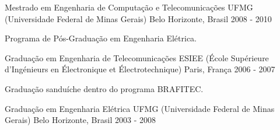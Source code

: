 

\begin{cventries}

  \cventry
    {Mestrado em Engenharia de Computação e Telecomunicações} %
    {UFMG (Universidade Federal de Minas Gerais)} %
    {Belo Horizonte, Brasil} %
    {2008 - 2010} %
    {
      \begin{cvitems} %
        \item {Programa de Pós-Graduação em Engenharia Elétrica.}
      \end{cvitems}
    }

  \cventry
    {Graduação em Engenharia de Telecomunicações} %
    {ESIEE (École Supérieure d’Ingénieurs en Électronique et Électrotechnique)} %
    {Paris, França} %
    {2006 - 2007} %
    {
      \begin{cvitems} %
        \item {Graduação sanduíche dentro do programa BRAFITEC.}
      \end{cvitems}
    }


  \cventry
    {Graduação em Engenharia Elétrica} %
    {UFMG (Universidade Federal de Minas Gerais)} %
    {Belo Horizonte, Brasil} %
    {2003 - 2008}
	{}

\end{cventries}
